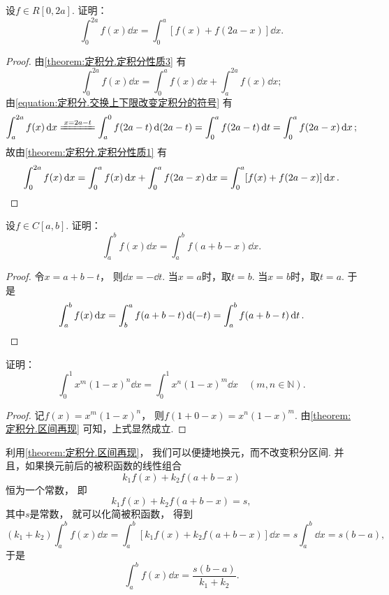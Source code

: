 \begin{example}
设\(f \in R[0,2a]\).
证明：\begin{equation}\label{equation:定积分.区间折半}
	\int_0^{2a} f(x) \dd{x} = \int_0^a [f(x) + f(2a-x)] \dd{x}.
\end{equation}
\begin{proof}
由\cref{theorem:定积分.定积分性质3} 有\[
	\int_0^{2a} f(x) \dd{x}
	= \int_0^a f(x) \dd{x} + \int_a^{2a} f(x) \dd{x};
\]
由\cref{equation:定积分.交换上下限改变定积分的符号} 有\[
	\int_a^{2a} f(x) \dd{x}
	\xlongequal{x=2a-t} \int_a^0 f(2a-t) \dd(2a-t)
	= \int_0^a f(2a-t) \dd{t}
	= \int_0^a f(2a-x) \dd{x};
\]
故由\cref{theorem:定积分.定积分性质1} 有\[
	\int_0^{2a} f(x) \dd{x}
	= \int_0^a f(x) \dd{x} + \int_0^a f(2a-x) \dd{x}
	= \int_0^a [f(x) + f(2a-x)] \dd{x}.
	\qedhere
\]
\end{proof}
\end{example}

\begin{proposition}\label{theorem:定积分.区间再现}
设\(f \in C[a,b]\).
证明：\begin{equation}
	\int_a^b f(x) \dd{x}
	= \int_a^b f(a+b-x) \dd{x}.
\end{equation}
\begin{proof}
令\(x=a+b-t\)，
则\(\dd{x} = -\dd{t}\).
当\(x=a\)时，取\(t=b\).
当\(x=b\)时，取\(t=a\).
于是\[
	\int_a^b f(x) \dd{x}
	= \int_b^a f(a+b-t) \dd(-t)
	= \int_a^b f(a+b-t) \dd{t}.
	\qedhere
\]
\end{proof}
\end{proposition}

\begin{example}\label{example:欧拉第一型积分.轮换对称性1}
证明：\begin{equation}
	\int_0^1 x^m (1-x)^n \dd{x}
	= \int_0^1 x^n (1-x)^m \dd{x}
	\quad(m,n\in\mathbb{N}).
\end{equation}
\begin{proof}
记\(f(x) = x^m (1-x)^n\)，
则\(f(1+0-x) = x^n (1-x)^m\).
由\cref{theorem:定积分.区间再现} 可知，上式显然成立.
\end{proof}
\end{example}

\begin{remark}
利用\cref{theorem:定积分.区间再现}，
我们可以便捷地换元，而不改变积分区间.
并且，如果换元前后的被积函数的线性组合\[
	k_1 f(x) + k_2 f(a+b-x)
\]恒为一个常数，
即\[
	k_1 f(x) + k_2 f(a+b-x) = s,
\]
其中\(s\)是常数，
就可以化简被积函数，
得到\[
	(k_1 + k_2) \int_a^b f(x) \dd{x}
	= \int_a^b [k_1 f(x) + k_2 f(a+b-x)] \dd{x}
	= s \int_a^b \dd{x} = s(b-a),
\]
于是\[
	\int_a^b f(x) \dd{x}
	= \frac{s(b-a)}{k_1 + k_2}.
\]
\end{remark}


